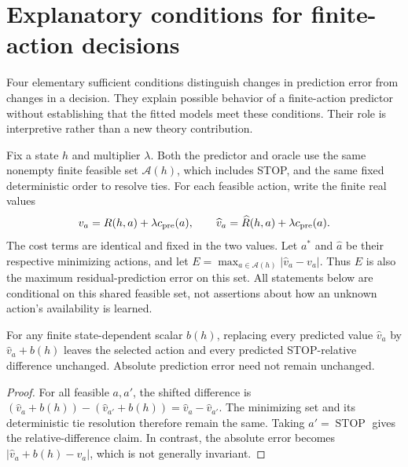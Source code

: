 \section{Explanatory conditions for finite-action decisions}
\label{sec:explanatory-propositions}

Four elementary sufficient conditions distinguish changes in prediction
error from changes in a decision. They explain possible behavior of a
finite-action predictor without establishing that the fitted models meet
these conditions. Their role is interpretive rather than a new theory
contribution.

Fix a state $h$ and multiplier $\lambda$. Both the predictor and oracle use
the same nonempty finite feasible set $\mathcal A(h)$, which includes STOP,
and the same fixed deterministic order to resolve ties. For each feasible
action, write the finite real values
\[
 v_a=R(h,a)+\lambda c_{\rm pre}(a),\qquad
 \widehat v_a=\widehat R(h,a)+\lambda c_{\rm pre}(a).
\]
The cost terms are identical and fixed in the two values. Let $a^*$ and
$\widehat a$ be their respective minimizing actions, and let
$E=\max_{a\in\mathcal A(h)}|\widehat v_a-v_a|$. Thus $E$ is also the
maximum residual-prediction error on this set. All statements below are
conditional on this shared feasible set, not assertions about how an
unknown action's availability is learned.

\begin{proposition}
\label{prop:common-mode-invariance}
For any finite state-dependent scalar $b(h)$, replacing every predicted
value $\widehat v_a$ by $\widehat v_a+b(h)$ leaves the selected action and
every predicted STOP-relative difference unchanged. Absolute prediction
error need not remain unchanged.
\end{proposition}
\begin{proof}
For all feasible $a,a'$, the shifted difference is
$(\widehat v_a+b(h))-(\widehat v_{a'}+b(h))
=\widehat v_a-\widehat v_{a'}$. The minimizing set and its deterministic
tie resolution therefore remain the same. Taking $a'=\operatorname{STOP}$
gives the relative-difference claim. In contrast, the absolute error becomes
$|\widehat v_a+b(h)-v_a|$, which is not generally invariant.
\end{proof}

